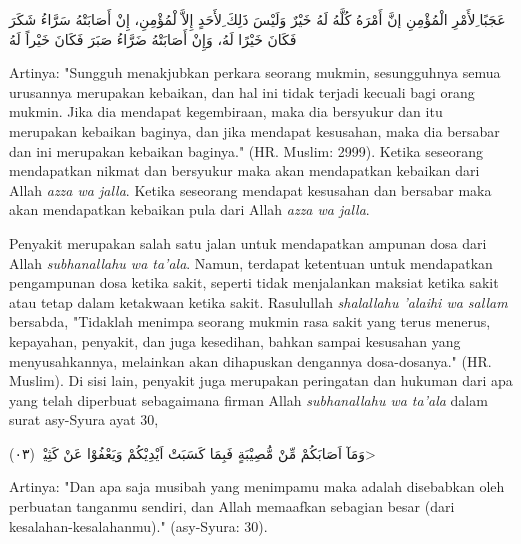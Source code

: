    \begin{flushright}
        \begin{RLtext}
            عَجَبًا ِلأَمْرِ الْمُؤْمِنِ إنَّ أَمْرَهُ كُلَّهُ لَهُ خَيْرٌ وَلَيْسَ ذَلِكَ ِلأَحَدٍ إِلاَّ لْمُؤْمِنِ، إِنْ أَصَابَتْهُ سَرَّاءُ شَكَرَ فَكَانَ خَيْرًا لَهُ، وَإِنْ أَصَابَتْهُ ضَرَّاءُ صَبَرَ فَكَانَ خَيْراً لَهُ
        \end{RLtext}
    \end{flushright}

    Artinya: "Sungguh menakjubkan perkara seorang mukmin, sesungguhnya semua urusannya merupakan kebaikan, dan hal ini tidak terjadi kecuali bagi orang mukmin. Jika dia mendapat kegembiraan, maka dia bersyukur dan itu merupakan kebaikan baginya, dan jika mendapat kesusahan, maka dia bersabar dan ini merupakan kebaikan baginya." (HR. Muslim: 2999). Ketika seseorang mendapatkan nikmat dan bersyukur maka akan mendapatkan kebaikan dari Allah \textit{azza wa jalla}. Ketika seseorang mendapat kesusahan dan bersabar maka akan mendapatkan kebaikan pula dari Allah \textit{azza wa jalla}.

    Penyakit merupakan salah satu jalan untuk mendapatkan ampunan dosa dari Allah \textit{subhanallahu wa ta'ala}. Namun, terdapat ketentuan untuk mendapatkan pengampunan dosa ketika sakit, seperti tidak menjalankan maksiat ketika sakit atau tetap dalam ketakwaan ketika sakit. Rasulullah \textit{shalallahu 'alaihi wa sallam} bersabda, "Tidaklah menimpa seorang mukmin rasa sakit yang terus menerus, kepayahan, penyakit, dan juga kesedihan, bahkan sampai kesusahan yang menyusahkannya, melainkan akan dihapuskan dengannya dosa-dosanya." (HR. Muslim). Di sisi lain, penyakit juga merupakan peringatan dan hukuman dari apa yang telah diperbuat sebagaimana firman Allah \textit{subhanallahu wa ta'ala} dalam surat asy-Syura ayat 30,

    \begin{flushright}
        \<وَمَآ اَصَابَكُمْ مِّنْ مُّصِيْبَةٍ فَبِمَا كَسَبَتْ اَيْدِيْكُمْ وَيَعْفُوْا عَنْ كَثِيْرٍۗ (٠٣)>
    \end{flushright}

    Artinya: "Dan apa saja musibah yang menimpamu maka adalah disebabkan oleh perbuatan tanganmu sendiri, dan Allah memaafkan sebagian besar (dari kesalahan-kesalahanmu)." (asy-Syura: 30).

